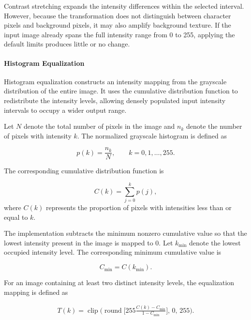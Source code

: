 \documentclass[conference]{IEEEtran}
\begin{document}
Contrast stretching expands the intensity differences within the selected
interval. However, because the transformation does not distinguish between
character pixels and background pixels, it may also amplify background
texture. If the input image already spans the full intensity range from
0 to 255, applying the default limits produces little or no change.

\paragraph{Histogram Equalization}

Histogram equalization constructs an intensity mapping from the grayscale
distribution of the entire image. It uses the cumulative distribution
function to redistribute the intensity levels, allowing densely populated
input intensity intervals to occupy a wider output range.

Let $N$ denote the total number of pixels in the image and $n_k$ denote
the number of pixels with intensity $k$. The normalized grayscale
histogram is defined as

\begin{equation}
p(k)=\frac{n_k}{N},
\qquad k=0,1,\ldots,255.
\label{eq:normalized_histogram}
\end{equation}

The corresponding cumulative distribution function is

\begin{equation}
C(k)=\sum_{j=0}^{k}p(j),
\label{eq:histogram_cdf}
\end{equation}
where $C(k)$ represents the proportion of pixels with intensities less
than or equal to $k$.

The implementation subtracts the minimum nonzero cumulative value so
that the lowest intensity present in the image is mapped to 0. Let
$k_{\min}$ denote the lowest occupied intensity level. The corresponding
minimum cumulative value is

\begin{equation}
C_{\min}=C(k_{\min}).
\label{eq:histogram_cdf_min}
\end{equation}

For an image containing at least two distinct intensity levels, the
equalization mapping is defined as

\begin{equation}
\begin{split}
T(k)=\operatorname{clip}\Bigg(
\operatorname{round}\Bigg[
255\frac{C(k)-C_{\min}}{1-C_{\min}}
\Bigg],\,0,\,255\Bigg).
\end{split}
\label{eq:histogram_mapping}
\end{equation}
\end{document}
